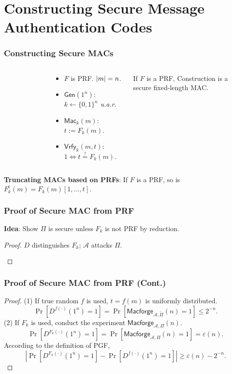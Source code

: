 \section{Constructing Secure Message Authentication Codes}
\begin{frame}\frametitle{Constructing Secure MACs}
\begin{columns}[C]
\begin{figure}
\begin{center}

\end{center}
\end{figure}
\begin{construction}
\begin{itemize}
\item $F$ is PRF. $\lvert m\rvert = n$.
\item $\mathsf{Gen}(1^n)$: $k \gets \{0,1\}^n$ \emph{u.a.r}.
\item $\mathsf{Mac}_k(m)$: $t := F_k(m)$.
\item $\mathsf{Vrfy}_k(m,t)$: $1 \iff t \overset{?}{=} F_k(m)$.
\end{itemize}
\end{construction}
\begin{theorem}\label{thm:mac}
If $F$ is a PRF, Construction is a secure fixed-length MAC.
\end{theorem}
\end{columns}
\begin{lemma}
\textbf{Truncating MACs based on PRFs}:
If $F$ is a PRF, so is $F^t_k(m) = F_k(m)[1,\dots,t]$.
\end{lemma}
\end{frame}
\begin{frame}\frametitle{Proof of Secure MAC from PRF}
\textbf{Idea}: Show $\Pi$ is secure unless $F_k$ is not PRF by reduction.  
\begin{proof}
$D$ distinguishes $F_k$; $\mathcal{A}$ attacks $\Pi$. 
\begin{figure}
\begin{center}

\end{center}
\end{figure}
\end{proof}
\end{frame}
\begin{frame}\frametitle{Proof of Secure MAC from PRF (Cont.)}
\begin{proof}
(1) If true random $f$ is used, $t=f(m)$ is uniformly distributed.
\[ \Pr[D^{f(\cdot)}(1^n)=1] = \Pr[\mathsf{Macforge}_{\mathcal{A},\tilde{\Pi}}(n) = 1] \le 2^{-n}.\]
(2) If $F_k$ is used, conduct the experiment $\mathsf{Macforge}_{\mathcal{A},\Pi}(n)$. 
\[ \Pr[D^{F_k(\cdot)}(1^n)=1] = \Pr[\mathsf{Macforge}_{\mathcal{A},\Pi}(n) = 1] = \varepsilon(n).\]
According to the definition of PGF,
\[ \left| \Pr[D^{F_k(\cdot)}(1^n)=1] - \Pr[D^{f(\cdot)}(1^n)=1] \right| \ge \varepsilon(n) - 2^{-n}. \]
\end{proof}
\end{frame}
